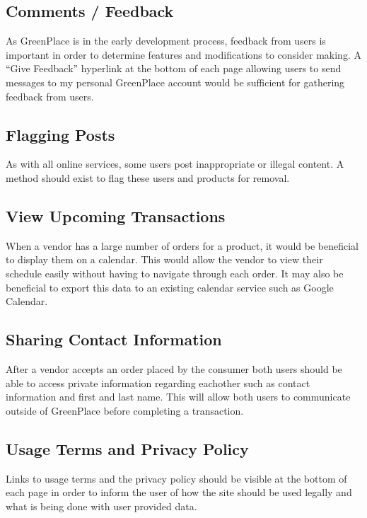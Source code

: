 \documentclass[letterpaper, 10 pt, conference]{ieeeconf}  %
\begin{document}
\subsection{Comments / Feedback}
As GreenPlace is in the early development process, feedback from users is important in order to determine features and modifications to consider making. A ``Give Feedback'' hyperlink at the bottom of each page allowing users to send messages to my personal GreenPlace account would be sufficient for gathering feedback from users.

\subsection{Flagging Posts}
As with all online services, some users post inappropriate or illegal content. A method should exist to flag these users and products for removal.

\subsection{View Upcoming Transactions}
When a vendor has a large number of orders for a product, it would be beneficial to display them on a calendar. This would allow the vendor to view their schedule easily without having to navigate through each order. It may also be beneficial to export this data to an existing calendar service such as Google Calendar.

\subsection{Sharing Contact Information}
After a vendor accepts an order placed by the consumer both users should be able to access private information regarding eachother such as contact information and first and last name. This will allow both users to communicate outside of GreenPlace before completing a transaction.

\subsection{Usage Terms and Privacy Policy}
Links to usage terms and the privacy policy should be visible at the bottom of each page in order to inform the user of how the site should be used legally and what is being done with user provided data.
\end{document}
